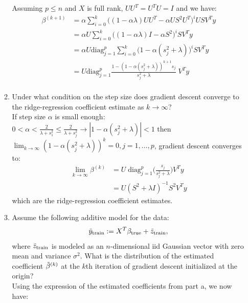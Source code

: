 \documentclass[12pt,twoside]{article}
\begin{document}
\begin{enumerate}
\begin{enumerate}
Assuming $p \le n$ and $X$ is full rank, $UU^T = U^T U = I$ and we have:
\begin{align*}
	\beta^{(k+1)}	&=  \alpha  \sum_{i=0}^k \big( (1  - \alpha \lambda) UU^T- \alpha U S^2 U^T \big)^i U S V^T y \\
				&= \alpha U   \sum_{i=0}^k \big( ( 1 - \alpha \lambda) I - \alpha S^2  \big)^i  S V^T y \\
				&=  \alpha U   \text{diag}_{j=1}^p \sum_{i=0}^k \big(  1 - \alpha (s_j^2 + \lambda)  \big)^i  S V^T y \\
				&=  U   \text{diag}_{j=1}^p \frac{ 1 - ( 1 - \alpha (s_j^2 + \lambda))^{k+1} s_j}{s_j^2 + \lambda}  \;  V^T y \\ 
\end{align*}

\item Under what condition on the step size does gradient descent converge to the ridge-regression coefficient estimate as $k \rightarrow \infty$?\\
If step size $\alpha$ is small enough: $0 < \alpha < \frac{2} {\lambda + s_1^2} \le \frac{2} {\lambda + s_j^2} \rightarrow |1 - \alpha (s_j^2 + \lambda)| < 1$ then
 $\lim_{k \rightarrow \infty} (1 - \alpha (s_j^2 + \lambda))^k =0, j=1, \dots ,p $, gradient descent converges to:
\begin{align*}
	\lim_{k \rightarrow \infty} \beta^{(k)}	&= U  \;  \text{diag}_{j=1}^p \bigg( \frac{s_j} {s_j^2 + \lambda} \bigg)  V^T y \\
									&= U (S^2 + \lambda I)^{-1} S^2 V^T y
\end{align*}
which are the ridge-regression coefficient estimates.

\item Assume the following additive model for the data:  
\begin{align}
\tilde{  y }_{\operatorname{train}} := X^T \beta_{\operatorname{true}} + \tilde{ z }_{\operatorname{train}},
\end{align}
where $\tilde{ z }_{\operatorname{train}}$ is modeled as an $n$-dimensional iid Gaussian vector with zero mean and variance $\sigma^2$. What is the distribution of the estimated coefficient $\tilde{ \beta }^{\left( k \right)}$ at the $k$th iteration of gradient descent initialized at the origin?\\
Using the expression of the estimated coefficients from part a, we now have:


\end{enumerate}
\end{enumerate}
\end{document}
